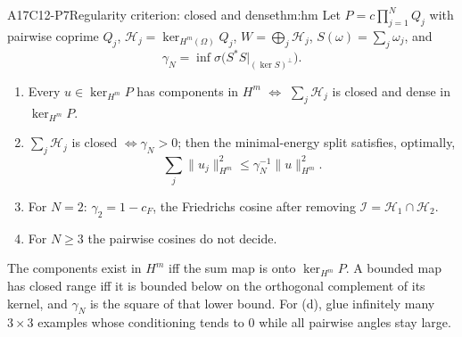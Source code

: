 \begin{dimcard}{A17}{C12-P7}{Regularity criterion: closed and dense}{\proved}{thm:hm}
Let $P=c\prod_{j=1}^NQ_j$ with pairwise coprime $Q_j$, $\mathcal H_j=\ker_{H^m(\Omega)}Q_j$, $W=\bigoplus_j\mathcal H_j$, $S(\omega)=\sum_j\omega_j$, and
\[
\gamma_N=\inf\sigma\big(S^*S\big|_{(\ker S)^\perp}\big).
\]
\begin{enumerate}[label=(\alph*)]
\item Every $u\in\ker_{H^m}P$ has components in $H^m$ $\iff$ $\sum_j\mathcal H_j$ is closed and dense in $\ker_{H^m}P$.
\item $\sum_j\mathcal H_j$ is closed $\iff\gamma_N>0$; then the minimal-energy split satisfies, optimally,
\[
\sum_j\|u_j\|_{H^m}^2\le\gamma_N^{-1}\|u\|_{H^m}^2 .
\]
\item For $N=2$: $\gamma_2=1-c_F$, the Friedrichs cosine after removing $\mathcal I=\mathcal H_1\cap\mathcal H_2$.
\item For $N\ge3$ the pairwise cosines do not decide.
\end{enumerate}
\end{dimcard}

\begin{proofidea}
The components exist in $H^m$ iff the sum map is onto $\ker_{H^m}P$. A bounded map has closed range iff it is bounded below on the orthogonal complement of its kernel, and $\gamma_N$ is the square of that lower bound. For (d), glue infinitely many $3\times3$ examples whose conditioning tends to $0$ while all pairwise angles stay large.
\end{proofidea}

